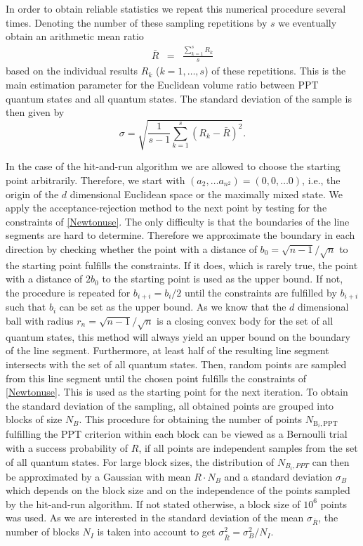 \documentclass[12pt]{iopart}
\begin{document}
In order to obtain reliable statistics we repeat this numerical procedure
several times. Denoting the number of these sampling repetitions by $s$
we eventually obtain an arithmetic mean ratio
\begin{eqnarray}
 \bar{R}&=&\frac{\sum^s_{k=1} R_k}{s} 
\end{eqnarray}
based on the individual results  $R_k$ ($k=1, \dots, s$) of these repetitions. This is the main estimation parameter for the Euclidean volume ratio between PPT quantum states and all quantum states. 
The standard deviation of the sample is then given by
\begin{equation}
 \sigma=\sqrt{\frac{1}{s-1} \sum^s_{k=1} \left(R_k-\bar{R}\right)^2}.
\end{equation}

In the case of the hit-and-run algorithm we are allowed to choose the starting point arbitrarily. Therefore, we start with $(a_2,\dots a_{n^2})=(0,0,\dots 0)$, i.e., the origin of the $d$ dimensional 
Euclidean space or the maximally mixed state. We apply the acceptance-rejection method to the next point by testing for the constraints of \eqref{Newtonuse}. The only difficulty is that the boundaries of the 
line segments are hard to determine.
Therefore we approximate the boundary in each direction by checking whether the point with a distance of $b_0=\sqrt{n-1}/\sqrt{n}$ to the starting point fulfills the constraints. 
If it does, which is rarely true, the point with a distance of $2b_0$ to the starting point is used as the upper bound.
If not, the procedure is repeated for $b_{i+i}=b_i/2$ until the constraints are fulfilled by $b_{i+i}$ such that $b_i$ can be set as the upper bound.
As we know that the $d$ dimensional ball with radius $r_n=\sqrt{n-1}/\sqrt{n}$ is a closing convex body for the set of all quantum states, this method will always yield an upper bound on the boundary of the line 
segment. 
Furthermore, at least half of the resulting line segment intersects with the set of all quantum states.
Then, random points are sampled from this line segment until the chosen point fulfills the constraints of \eqref{Newtonuse}.
This is used as the starting point for the next iteration. 
To obtain the standard deviation of the sampling, all obtained points are grouped into blocks of size $N_B$. This procedure for
obtaining the number of points $N_{\text{B}_i,\text{PPT}}$  fulfilling the PPT criterion within each block can be viewed as a Bernoulli trial with a success probability of $R$, 
if all points are independent samples 
from the set of all quantum states.
For large block sizes, the distribution of $N_{B_i, PPT}$ can then be approximated by a Gaussian with mean $R \cdot N_B$ and a standard deviation $\sigma_B$ which depends on the block size and on the independence 
of the points sampled by the 
hit-and-run algorithm. If not stated otherwise, a block size of $10^6$ points was used.
As we are interested in the standard deviation of the mean $\sigma_{\bar{R}}$, the number of blocks $N_I$ is taken into account to get $\sigma_{\bar{R}}^2 = \sigma_B^2/N_I $.  
\end{document}
